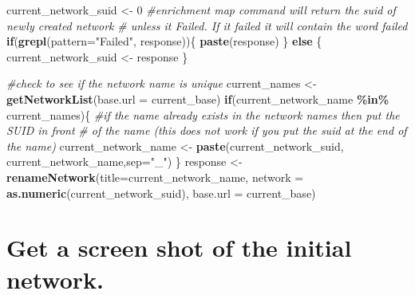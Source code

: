 \documentclass[
]{book}
\newenvironment{Shaded}{\begin{snugshade}}{\end{snugshade}}
\newcommand{\AttributeTok}[1]{\textcolor[rgb]{0.13,0.29,0.53}{#1}}
\newcommand{\CommentTok}[1]{\textcolor[rgb]{0.56,0.35,0.01}{\textit{#1}}}
\newcommand{\ControlFlowTok}[1]{\textcolor[rgb]{0.13,0.29,0.53}{\textbf{#1}}}
\newcommand{\DecValTok}[1]{\textcolor[rgb]{0.00,0.00,0.81}{#1}}
\newcommand{\FunctionTok}[1]{\textcolor[rgb]{0.13,0.29,0.53}{\textbf{#1}}}
\newcommand{\NormalTok}[1]{#1}
\newcommand{\OtherTok}[1]{\textcolor[rgb]{0.56,0.35,0.01}{#1}}
\newcommand{\SpecialCharTok}[1]{\textcolor[rgb]{0.81,0.36,0.00}{\textbf{#1}}}
\newcommand{\StringTok}[1]{\textcolor[rgb]{0.31,0.60,0.02}{#1}}
\begin{document}
\begin{Shaded}
\begin{Highlighting}[]
\NormalTok{current\_network\_suid }\OtherTok{\textless{}{-}} \DecValTok{0}
\CommentTok{\#enrichment map command will return the suid of newly created network }
\CommentTok{\# unless it Failed.  If it failed it will contain the word failed}
\ControlFlowTok{if}\NormalTok{(}\FunctionTok{grepl}\NormalTok{(}\AttributeTok{pattern=}\StringTok{"Failed"}\NormalTok{, response))\{}
  \FunctionTok{paste}\NormalTok{(response)}
\NormalTok{\} }\ControlFlowTok{else}\NormalTok{ \{}
\NormalTok{  current\_network\_suid }\OtherTok{\textless{}{-}}\NormalTok{ response}
\NormalTok{\}}

\CommentTok{\#check to see if the network name is unique}
\NormalTok{current\_names }\OtherTok{\textless{}{-}} \FunctionTok{getNetworkList}\NormalTok{(}\AttributeTok{base.url =}\NormalTok{ current\_base)}
\ControlFlowTok{if}\NormalTok{(current\_network\_name }\SpecialCharTok{\%in\%}\NormalTok{ current\_names)\{}
  \CommentTok{\#if the name already exists in the network names then put the SUID in front}
  \CommentTok{\# of the name (this does not work if you put the suid at the end of the name)}
\NormalTok{  current\_network\_name }\OtherTok{\textless{}{-}} \FunctionTok{paste}\NormalTok{(current\_network\_suid,}
\NormalTok{                                current\_network\_name,}\AttributeTok{sep=}\StringTok{"\_"}\NormalTok{)}
\NormalTok{\}}
\NormalTok{response }\OtherTok{\textless{}{-}} \FunctionTok{renameNetwork}\NormalTok{(}\AttributeTok{title=}\NormalTok{current\_network\_name, }
                       \AttributeTok{network =} \FunctionTok{as.numeric}\NormalTok{(current\_network\_suid),}
                       \AttributeTok{base.url =}\NormalTok{ current\_base)}
\end{Highlighting}
\end{Shaded}

\section{Get a screen shot of the initial network.}\label{get-a-screen-shot-of-the-initial-network.-1}
\end{document}
